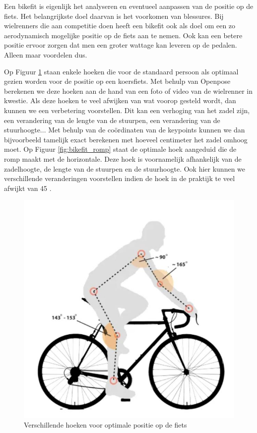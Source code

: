 \documentclass[a4paper,twoside,kulak]{kulakreport}
\begin{document}
Een bikefit is eigenlijk het analyseren en eventueel aanpassen van de positie op de fiets. Het belangrijkste doel daarvan is het voorkomen van blessures. Bij wielrenners die aan competitie doen heeft een bikefit ook als doel om een zo aerodynamisch mogelijke positie op de fiets aan te nemen. Ook kan een betere positie ervoor zorgen dat men een groter wattage kan leveren op de pedalen. Alleen maar voordelen dus.

Op Figuur \ref{fig:bikefit} staan enkele hoeken die voor de standaard persoon als optimaal gezien worden voor de positie op een koersfiets. Met behulp van Openpose berekenen we deze hoeken aan de hand van een foto of video van de wielrenner in kwestie. Als deze hoeken te veel afwijken van wat voorop gesteld wordt, dan kunnen we een verbetering voorstellen. Dit kan een verhoging van het zadel zijn, een verandering van de lengte van de stuurpen, een verandering van de stuurhoogte... Met behulp van de coördinaten van de keypoints kunnen we dan bijvoorbeeld tamelijk exact berekenen met hoeveel centimeter het zadel omhoog moet.
Op Figuur \ref{fig:bikefit_romp} staat de optimale hoek aangeduid die de romp maakt met de horizontale. Deze hoek is voornamelijk afhankelijk van de zadelhoogte, de lengte van de stuurpen en de stuurhoogte. Ook hier kunnen we verschillende veranderingen voorstellen indien de hoek in de praktijk te veel afwijkt van 45 \degree.

\begin{figure}[H]
	\centering
	\includegraphics[width=\textwidth]{bikefit}
	\caption{Verschillende hoeken voor optimale positie op de fiets}
	\label{fig:bikefit}
\end{figure}
\end{document}
